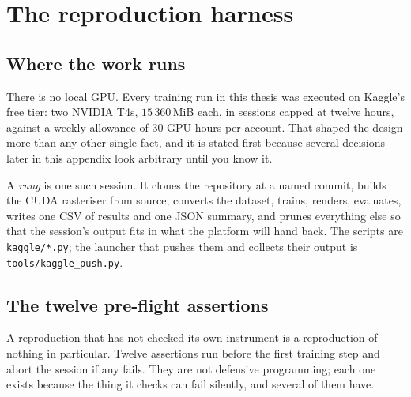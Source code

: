 \chapter{The reproduction harness}
\label{app:harness}


\section{Where the work runs}

There is no local GPU. Every training run in this thesis was executed on Kaggle's
free tier: two NVIDIA T4s, $15\,360$\,MiB each, in sessions capped at twelve
hours, against a weekly allowance of $30$ GPU-hours per account. That shaped the
design more than any other single fact, and it is stated first because several
decisions later in this appendix look arbitrary until you know it.

A \emph{rung} is one such session. It clones the repository at a named commit,
builds the CUDA rasteriser from source, converts the dataset, trains, renders,
evaluates, writes one CSV of results and one JSON summary, and prunes everything
else so that the session's output fits in what the platform will hand back. The
scripts are \texttt{kaggle/*.py}; the launcher that pushes them and collects
their output is \texttt{tools/kaggle\_push.py}.

\section{The twelve pre-flight assertions}
\label{app:preflight}

A reproduction that has not checked its own instrument is a reproduction of
nothing in particular. Twelve assertions run before the first training step and
abort the session if any fails. They are not defensive programming; each one
exists because the thing it checks can fail silently, and several of them have.



